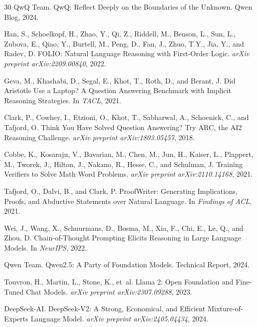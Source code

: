 \documentclass[11pt,a4paper]{article}
\begin{document}
\begin{thebibliography}{30}
QwQ Team.
\newblock QwQ: Reflect Deeply on the Boundaries of the Unknown.
\newblock Qwen Blog, 2024.

Han, S., Schoelkopf, H., Zhao, Y., Qi, Z., Riddell, M., Benson, L., Sun, L., Zubova, E., Qiao, Y., Burtell, M., Peng, D., Fan, J., Zhuo, T.Y., Jia, Y., and Radev, D.
\newblock FOLIO: Natural Language Reasoning with First-Order Logic.
\newblock \emph{arXiv preprint arXiv:2209.00840}, 2022.

Geva, M., Khashabi, D., Segal, E., Khot, T., Roth, D., and Berant, J.
\newblock Did Aristotle Use a Laptop? A Question Answering Benchmark with Implicit Reasoning Strategies.
\newblock In \emph{TACL}, 2021.

Clark, P., Cowhey, I., Etzioni, O., Khot, T., Sabharwal, A., Schoenick, C., and Tafjord, O.
\newblock Think You Have Solved Question Answering? Try ARC, the AI2 Reasoning Challenge.
\newblock \emph{arXiv preprint arXiv:1803.05457}, 2018.

Cobbe, K., Kosaraju, V., Bavarian, M., Chen, M., Jun, H., Kaiser, L., Plappert, M., Tworek, J., Hilton, J., Nakano, R., Hesse, C., and Schulman, J.
\newblock Training Verifiers to Solve Math Word Problems.
\newblock \emph{arXiv preprint arXiv:2110.14168}, 2021.

Tafjord, O., Dalvi, B., and Clark, P.
\newblock ProofWriter: Generating Implications, Proofs, and Abductive Statements over Natural Language.
\newblock In \emph{Findings of ACL}, 2021.

Wei, J., Wang, X., Schuurmans, D., Bosma, M., Xia, F., Chi, E., Le, Q., and Zhou, D.
\newblock Chain-of-Thought Prompting Elicits Reasoning in Large Language Models.
\newblock In \emph{NeurIPS}, 2022.

Qwen Team.
\newblock Qwen2.5: A Party of Foundation Models.
\newblock Technical Report, 2024.

Touvron, H., Martin, L., Stone, K., et~al.
\newblock Llama 2: Open Foundation and Fine-Tuned Chat Models.
\newblock \emph{arXiv preprint arXiv:2307.09288}, 2023.

DeepSeek-AI.
\newblock DeepSeek-V2: A Strong, Economical, and Efficient Mixture-of-Experts Language Model.
\newblock \emph{arXiv preprint arXiv:2405.04434}, 2024.

\end{thebibliography}
\end{document}
